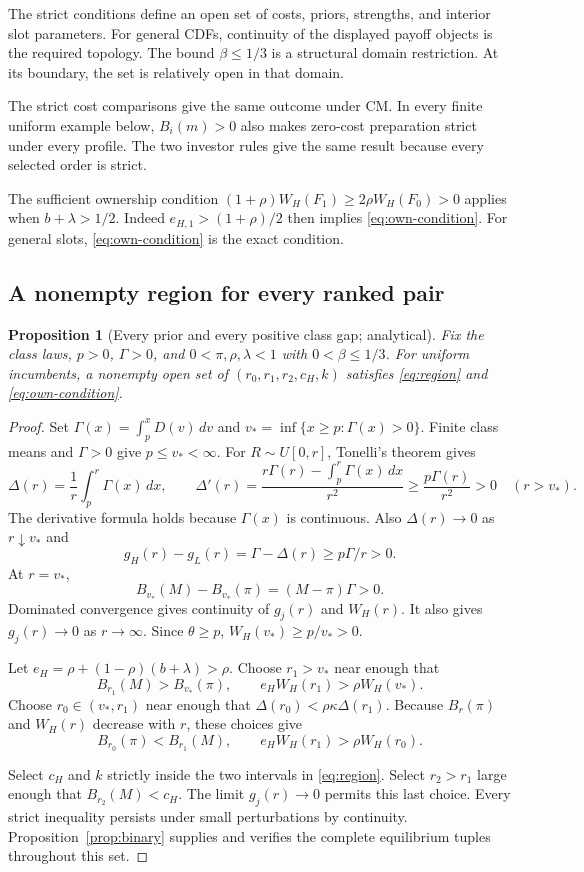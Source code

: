 \documentclass[12pt]{article}
\newtheorem{proposition}{Proposition}
\newcommand{\dd}{\,d}
\begin{document}
The strict conditions define an open set of costs, priors, strengths, and interior slot parameters.
For general CDFs, continuity of the displayed payoff objects is the required topology.
The bound $\beta\le1/3$ is a structural domain restriction.
At its boundary, the set is relatively open in that domain.

The strict cost comparisons give the same outcome under CM.
In every finite uniform example below, $B_i(m)>0$ also makes zero-cost preparation strict under every profile.
The two investor rules give the same result because every selected order is strict.

The sufficient ownership condition $(1+\rho)W_H(F_1)\ge2\rho W_H(F_0)>0$ applies when $b+\lambda>1/2$.
Indeed $e_{H,1}>(1+\rho)/2$ then implies \eqref{eq:own-condition}.
For general slots, \eqref{eq:own-condition} is the exact condition.

\subsection{A nonempty region for every ranked pair}

\begin{proposition}[Every prior and every positive class gap; analytical]\label{prop:nonempty}
Fix the class laws, $p>0$, $\Gamma>0$, and $0<\pi,\rho,\lambda<1$ with $0<\beta\le1/3$.
For uniform incumbents, a nonempty open set of $(r_0,r_1,r_2,c_H,k)$ satisfies \eqref{eq:region} and \eqref{eq:own-condition}.
\end{proposition}

\begin{proof}
Set $\Gamma(x)=\int_p^xD(v)\dd v$ and $v_* =\inf\{x\ge p:\Gamma(x)>0\}$.
Finite class means and $\Gamma>0$ give $p\le v_*<\infty$.
For $R\sim U[0,r]$, Tonelli's theorem gives
\begin{equation}\label{eq:nonempty}
 \Delta(r)=\frac1r\int_p^r\Gamma(x)\dd x,\qquad
 \Delta'(r)=\frac{r\Gamma(r)-\int_p^r\Gamma(x)\dd x}{r^2}
 \ge\frac{p\Gamma(r)}{r^2}>0\quad(r>v_*).
\end{equation}
The derivative formula holds because $\Gamma(x)$ is continuous.
Also $\Delta(r)\to0$ as $r\downarrow v_*$ and
\[
 g_H(r)-g_L(r)=\Gamma-\Delta(r)\ge p\Gamma/r>0.
\]
At $r=v_*$,
\[
 B_{v_*}(M)-B_{v_*}(\pi)=(M-\pi)\Gamma>0.
\]
Dominated convergence gives continuity of $g_j(r)$ and $W_H(r)$.
It also gives $g_j(r)\to0$ as $r\to\infty$.
Since $\theta\ge p$, $W_H(v_*)\ge p/v_*>0$.

Let $e_H=\rho+(1-\rho)(b+\lambda)>\rho$.
Choose $r_1>v_*$ near enough that
\[
 B_{r_1}(M)>B_{v_*}(\pi),\qquad e_HW_H(r_1)>\rho W_H(v_*).
\]
Choose $r_0\in(v_*,r_1)$ near enough that $\Delta(r_0)<\rho\kappa\Delta(r_1)$.
Because $B_r(\pi)$ and $W_H(r)$ decrease with $r$, these choices give
\[
 B_{r_0}(\pi)<B_{r_1}(M),\qquad e_HW_H(r_1)>\rho W_H(r_0).
\]

Select $c_H$ and $k$ strictly inside the two intervals in \eqref{eq:region}.
Select $r_2>r_1$ large enough that $B_{r_2}(M)<c_H$.
The limit $g_j(r)\to0$ permits this last choice.
Every strict inequality persists under small perturbations by continuity.
Proposition~\ref{prop:binary} supplies and verifies the complete equilibrium tuples throughout this set.
\end{proof}
\end{document}
